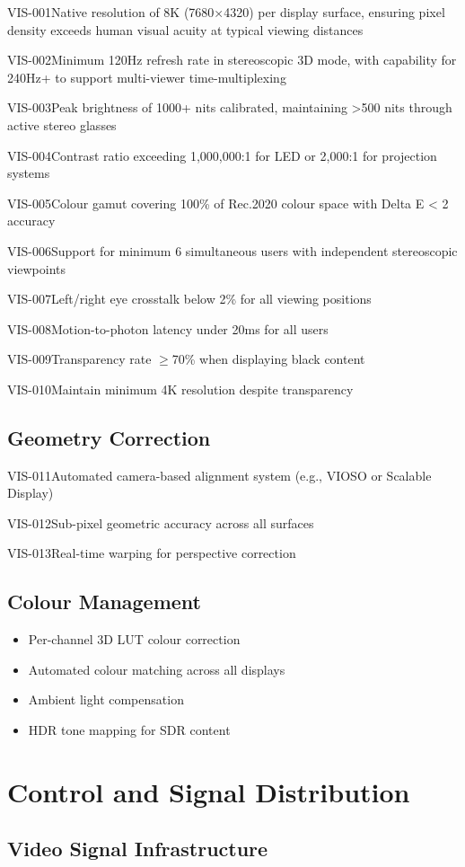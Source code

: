 \begin{requirement}{VIS-001}{Native resolution of 8K (7680×4320) per display surface, ensuring pixel density exceeds human visual acuity at typical viewing distances}
\begin{requirement}{VIS-002}{Minimum 120Hz refresh rate in stereoscopic 3D mode, with capability for 240Hz+ to support multi-viewer time-multiplexing}
\begin{requirement}{VIS-003}{Peak brightness of 1000+ nits calibrated, maintaining >500 nits through active stereo glasses}
\begin{requirement}{VIS-004}{Contrast ratio exceeding 1,000,000:1 for LED or 2,000:1 for projection systems}
\begin{requirement}{VIS-005}{Colour gamut covering 100\% of Rec.2020 colour space with Delta E < 2 accuracy}
\begin{requirement}{VIS-006}{Support for minimum 6 simultaneous users with independent stereoscopic viewpoints}
\begin{requirement}{VIS-007}{Left/right eye crosstalk below 2\% for all viewing positions}
\begin{requirement}{VIS-008}{Motion-to-photon latency under 20ms for all users}
\begin{requirement}{VIS-009}{Transparency rate $\ge$70\% when displaying black content}
\begin{requirement}{VIS-010}{Maintain minimum 4K resolution despite transparency}
\subsection{Geometry Correction}

\begin{requirement}{VIS-011}{Automated camera-based alignment system (e.g., VIOSO or Scalable Display)}

\begin{requirement}{VIS-012}{Sub-pixel geometric accuracy across all surfaces}

\begin{requirement}{VIS-013}{Real-time warping for perspective correction}

\subsection{Colour Management}

\begin{itemize}
    \item Per-channel 3D LUT colour correction
    \item Automated colour matching across all displays
    \item Ambient light compensation
    \item HDR tone mapping for SDR content
\end{itemize}

\section{Control and Signal Distribution}

\subsection{Video Signal Infrastructure}


\end{requirement}
\end{requirement}
\end{requirement}
\end{requirement}
\end{requirement}
\end{requirement}
\end{requirement}
\end{requirement}
\end{requirement}
\end{requirement}
\end{requirement}
\end{requirement}
\end{requirement}
